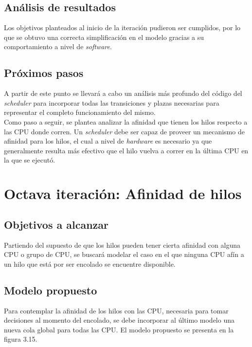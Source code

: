 \documentclass[a4paper]{book}
\begin{document}
\subsection{An\'alisis de resultados}
Los objetivos planteados al inicio de la iteraci\'on pudieron ser cumplidos, por lo que se obtuvo una correcta simplificaci\'on en el modelo gracias a su comportamiento a nivel de \emph{software}.

\subsection{Pr\'oximos pasos}
A partir de este punto se llevar\'a a cabo un an\'alisis m\'as profundo del c\'odigo del \emph{scheduler} para incorporar todas las transiciones y plazas necesarias para representar el completo funcionamiento del mismo.\\

Como paso a seguir, se plantea analizar la afinidad que tienen los hilos respecto a las CPU donde corren. Un \emph{scheduler} debe ser capaz de proveer un mecanismo de afinidad para los hilos, el cual a nivel de \emph{hardware} es necesario ya que generalmente resulta m\'as efectivo que el hilo vuelva a correr en la \'ultima CPU en la que se ejecut\'o.


\newpage
\section{Octava iteraci\'on: Afinidad de hilos}

\subsection{Objetivos a alcanzar}
Partiendo del supuesto de que los hilos pueden tener cierta afinidad con alguna CPU o grupo de CPU, se buscar\'a modelar el caso en el que ninguna CPU af\'in a un hilo que est\'a por ser encolado se encuentre disponible.

\subsection{Modelo propuesto}
Para contemplar la afinidad de los hilos con las CPU, necesaria para tomar decisiones al momento del encolado, se debe incorporar al \'ultimo modelo una nueva cola global para todas las CPU. El modelo propuesto se presenta en la figura 3.15.
\end{document}

